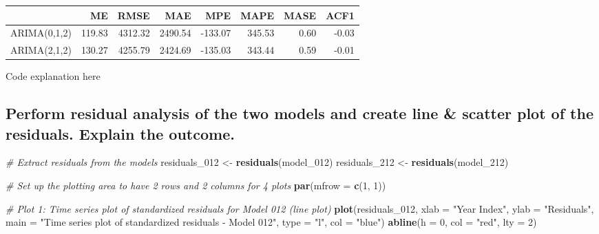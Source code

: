 \documentclass[
]{book}
\newenvironment{Shaded}{\begin{snugshade}}{\end{snugshade}}
\newcommand{\AttributeTok}[1]{\textcolor[rgb]{0.13,0.29,0.53}{#1}}
\newcommand{\CommentTok}[1]{\textcolor[rgb]{0.56,0.35,0.01}{\textit{#1}}}
\newcommand{\DecValTok}[1]{\textcolor[rgb]{0.00,0.00,0.81}{#1}}
\newcommand{\FunctionTok}[1]{\textcolor[rgb]{0.13,0.29,0.53}{\textbf{#1}}}
\newcommand{\NormalTok}[1]{#1}
\newcommand{\OtherTok}[1]{\textcolor[rgb]{0.56,0.35,0.01}{#1}}
\newcommand{\StringTok}[1]{\textcolor[rgb]{0.31,0.60,0.02}{#1}}
\begin{document}
\begin{table}
\centering\begingroup\fontsize{12}{14}\selectfont

\begin{tabular}{l|r|r|r|r|r|r|r}
\hline
  & ME & RMSE & MAE & MPE & MAPE & MASE & ACF1\\
\hline
ARIMA(0,1,2) & 119.83 & 4312.32 & 2490.54 & -133.07 & 345.53 & 0.60 & -0.03\\
\hline
ARIMA(2,1,2) & 130.27 & 4255.79 & 2424.69 & -135.03 & 343.44 & 0.59 & -0.01\\
\hline
\end{tabular}
\endgroup{}
\end{table}

Code explanation here

\subsection{Perform residual analysis of the two models and create line \& scatter plot of the residuals. Explain the outcome.}\label{perform-residual-analysis-of-the-two-models-and-create-line-scatter-plot-of-the-residuals.-explain-the-outcome.}

\begin{Shaded}
\begin{Highlighting}[]
\CommentTok{\# Extract residuals from the models}
\NormalTok{residuals\_012 }\OtherTok{\textless{}{-}} \FunctionTok{residuals}\NormalTok{(model\_012)}
\NormalTok{residuals\_212 }\OtherTok{\textless{}{-}} \FunctionTok{residuals}\NormalTok{(model\_212)}

\CommentTok{\# Set up the plotting area to have 2 rows and 2 columns for 4 plots}
\FunctionTok{par}\NormalTok{(}\AttributeTok{mfrow =} \FunctionTok{c}\NormalTok{(}\DecValTok{1}\NormalTok{, }\DecValTok{1}\NormalTok{))}

\CommentTok{\# Plot 1: Time series plot of standardized residuals for Model 012 (line plot)}
\FunctionTok{plot}\NormalTok{(residuals\_012,}
     \AttributeTok{xlab =} \StringTok{"Year Index"}\NormalTok{, }\AttributeTok{ylab =} \StringTok{"Residuals"}\NormalTok{,}
     \AttributeTok{main =} \StringTok{"Time series plot of standardized residuals {-} Model 012"}\NormalTok{,}
     \AttributeTok{type =} \StringTok{"l"}\NormalTok{, }\AttributeTok{col =} \StringTok{"blue"}\NormalTok{)}
\FunctionTok{abline}\NormalTok{(}\AttributeTok{h =} \DecValTok{0}\NormalTok{, }\AttributeTok{col =} \StringTok{"red"}\NormalTok{, }\AttributeTok{lty =} \DecValTok{2}\NormalTok{)}
\end{Highlighting}
\end{Shaded}
\end{document}

